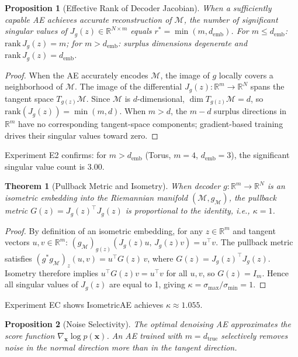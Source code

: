 \documentclass[lettersize,journal]{IEEEtran}
\newcommand{\dtrue}{d_{\mathrm{true}}}
\newcommand{\Jg}{J_g}
\newcommand{\R}{\mathbb{R}}
\newcommand{\kap}{\kappa}
\newcommand{\demb}{d_{\mathrm{emb}}}
\newtheorem{theorem}{Theorem}
\newtheorem{proposition}{Proposition}
\begin{document}
\begin{proposition}[Effective Rank of Decoder Jacobian]\label{thm:rank}
When a sufficiently capable AE achieves accurate reconstruction of $\mathcal{M}$, the number of significant singular values of $\Jg(z) \in \R^{N\times m}$ equals $r^* = \min(m, \demb)$.
For $m \leq \demb$: $\mathrm{rank}\,\Jg(z) = m$; for $m > \demb$: surplus dimensions degenerate and $\mathrm{rank}\,\Jg(z) = \demb$.
\end{proposition}

\begin{proof}
When the AE accurately encodes $\mathcal{M}$, the image of $g$ locally covers a neighborhood of $\mathcal{M}$.
The image of the differential $\Jg(z): \R^m \to \R^N$ spans the tangent space $T_{g(z)}\mathcal{M}$.
Since $\mathcal{M}$ is $d$-dimensional, $\dim T_{g(z)}\mathcal{M} = d$, so $\mathrm{rank}(\Jg(z)) = \min(m, d)$.
When $m > d$, the $m - d$ surplus directions in $\R^m$ have no corresponding tangent-space components;
gradient-based training drives their singular values toward zero.
\end{proof}

Experiment E2 confirms: for $m > \demb$ (Torus, $m=4$, $\demb=3$), the significant singular value count is 3.00.

\begin{theorem}[Pullback Metric and Isometry]\label{thm:pullback}
When decoder $g: \R^m \to \R^N$ is an isometric embedding into the Riemannian manifold $(\mathcal{M}, g_\mathcal{M})$, the pullback metric $G(z) = \Jg(z)^\top \Jg(z)$ is proportional to the identity, i.e., $\kap = 1$.
\end{theorem}

\begin{proof}
By definition of an isometric embedding, for any $z \in \R^m$ and tangent vectors $u, v \in \R^m$:
$(g_\mathcal{M})_{g(z)}(\Jg(z)u,\, \Jg(z)v) = u^\top v$.
The pullback metric satisfies $(g^* g_\mathcal{M})_z(u,v) = u^\top G(z)\, v$, where $G(z) = \Jg(z)^\top \Jg(z)$.
Isometry therefore implies $u^\top G(z) v = u^\top v$ for all $u, v$, so $G(z) = I_m$.
Hence all singular values of $\Jg(z)$ are equal to 1, giving $\kap = \sigma_{\max}/\sigma_{\min} = 1$.
\end{proof}

Experiment EC shows IsometricAE achieves $\kap \approx 1.055$.

\begin{proposition}[Noise Selectivity]\label{thm:nsr}
The optimal denoising AE approximates the score function $\nabla_{\boldsymbol{x}}\log p(\boldsymbol{x})$.
An AE trained with $m = \dtrue$ selectively removes noise in the normal direction more than in the tangent direction.
\end{proposition}
\end{document}
